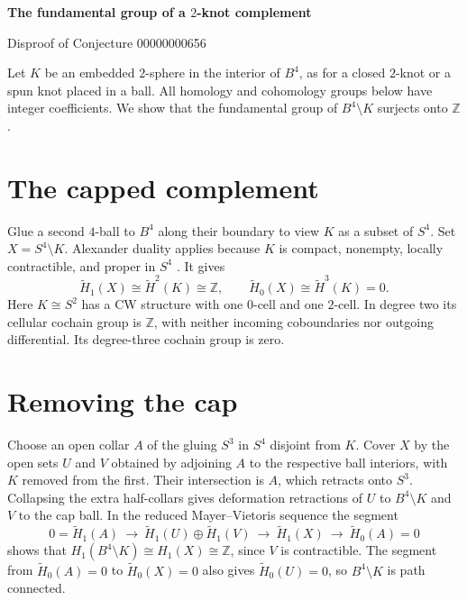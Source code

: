 \documentclass[10pt]{article}
\begin{document}
\begin{center}
  {\Large\bfseries The fundamental group of a \(2\)-knot complement\par}
  \smallskip
  Disproof of Conjecture 00000000656
\end{center}

Let \(K\) be an embedded \(2\)-sphere in the interior of \(B^4\),
as for a closed \(2\)-knot or a spun knot placed in a ball. All
homology and cohomology groups below have integer coefficients.
We show that the fundamental group of \(B^4\setminus K\) surjects
onto \(\mathbb Z\).

\section*{The capped complement}

Glue a second \(4\)-ball to \(B^4\) along their boundary to view
\(K\) as a subset of \(S^4\). Set \(X=S^4\setminus K\).
Alexander duality applies because \(K\) is compact, nonempty,
locally contractible, and proper in \(S^4\)
\cite[Corollary~3.45]{hatcher}. It gives
\[
  \widetilde H_1(X)\cong \widetilde H^2(K)\cong\mathbb Z,
  \qquad
  \widetilde H_0(X)\cong \widetilde H^3(K)=0 .
\]
Here \(K\cong S^2\) has a CW structure with one \(0\)-cell and
one \(2\)-cell. In degree two its cellular cochain group is
\(\mathbb Z\), with neither incoming coboundaries nor outgoing
differential. Its degree-three cochain group is zero.

\section*{Removing the cap}

Choose an open collar \(A\) of the gluing \(S^3\) in \(S^4\)
disjoint from \(K\). Cover \(X\) by the open sets \(U\) and \(V\)
obtained by adjoining \(A\) to the respective ball interiors, with
\(K\) removed from the first. Their intersection is \(A\), which
retracts onto \(S^3\). Collapsing the extra half-collars gives
deformation retractions of \(U\) to \(B^4\setminus K\) and \(V\)
to the cap ball. In the reduced Mayer--Vietoris sequence the segment
\[
  0=\widetilde H_1(A)\ \longrightarrow\
  \widetilde H_1(U)\oplus\widetilde H_1(V)\
  \longrightarrow\ \widetilde H_1(X)\
  \longrightarrow\ \widetilde H_0(A)=0
\]
shows that \(H_1(B^4\setminus K)\cong H_1(X)\cong\mathbb Z\),
since \(V\) is contractible. The segment from
\(\widetilde H_0(A)=0\) to \(\widetilde H_0(X)=0\)
also gives \(\widetilde H_0(U)=0\), so \(B^4\setminus K\)
is path connected.
\end{document}
